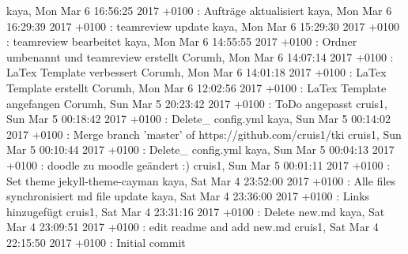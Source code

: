 kaya, Mon Mar 6 16:56:25 2017 +0100 : Aufträge aktualisiert
kaya, Mon Mar 6 16:29:39 2017 +0100 : teamreview update
kaya, Mon Mar 6 15:29:30 2017 +0100 : teamreview bearbeitet
kaya, Mon Mar 6 14:55:55 2017 +0100 : Ordner umbenannt und teamreview erstellt
Corumh, Mon Mar 6 14:07:14 2017 +0100 : LaTex Template verbessert
Corumh, Mon Mar 6 14:01:18 2017 +0100 : LaTex Template erstellt
Corumh, Mon Mar 6 12:02:56 2017 +0100 : LaTex Template angefangen
Corumh, Sun Mar 5 20:23:42 2017 +0100 : ToDo angepasst
cruis1, Sun Mar 5 00:18:42 2017 +0100 : Delete\_ config.yml
kaya, Sun Mar 5 00:14:02 2017 +0100 : Merge branch 'master' of https://github.com/cruis1/tki
cruis1, Sun Mar 5 00:10:44 2017 +0100 : Delete\_ config.yml
kaya, Sun Mar 5 00:04:13 2017 +0100 : doodle zu moodle geändert :)
cruis1, Sun Mar 5 00:01:11 2017 +0100 : Set theme jekyll-theme-cayman
kaya, Sat Mar 4 23:52:00 2017 +0100 : Alle files synchronisiert md file update
kaya, Sat Mar 4 23:36:00 2017 +0100 : Links hinzugefügt
cruis1, Sat Mar 4 23:31:16 2017 +0100 : Delete new.md
kaya, Sat Mar 4 23:09:51 2017 +0100 : edit readme and add new.md
cruis1, Sat Mar 4 22:15:50 2017 +0100 : Initial commit


